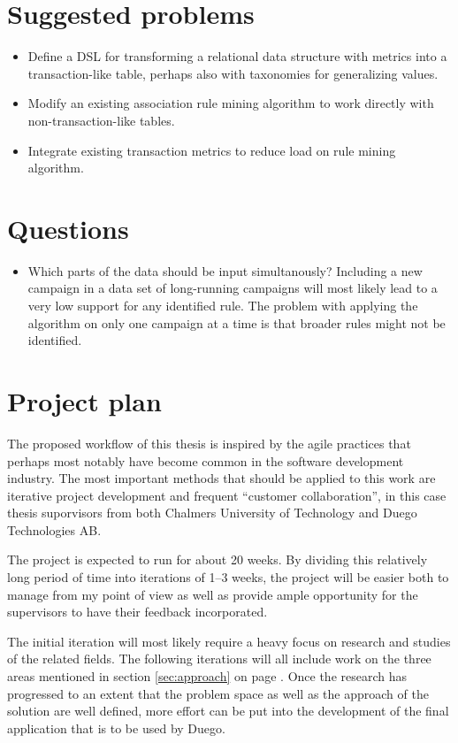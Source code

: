 \documentclass[a4paper]{article}
\begin{document}
\section{Suggested problems}
\begin{itemize}
	\item Define a DSL for transforming a relational data structure with metrics into a transaction-like table,
			perhaps also with taxonomies for generalizing values.
	\item Modify an existing association rule mining algorithm to work directly with non-transaction-like tables.
	\item Integrate existing transaction metrics to reduce load on rule mining algorithm.
\end{itemize}

\section{Questions}
\begin{itemize}
	\item Which parts of the data should be input simultanously? Including a new campaign in a data set of long-running
		campaigns will most likely lead to a very low support for any identified rule. The problem with applying the algorithm
		on only one campaign at a time is that broader rules might not be identified.
\end{itemize}

\section{Project plan}
The proposed workflow of this thesis is inspired by the agile practices that perhaps most notably have become
common in the software development industry. The most important methods that should be applied to this work are
iterative project development and frequent ``customer collaboration'', in this case thesis suporvisors from both
Chalmers University of Technology and Duego Technologies AB.

The project is expected to run for about 20 weeks. By dividing this relatively long period of time into iterations
of 1--3 weeks, the project will be easier both to manage from my point of view as well as provide ample opportunity
for the supervisors to have their feedback incorporated.

The initial iteration will most likely require a heavy focus on research and studies of the related fields. The following
iterations will all include work on the three areas mentioned in section \ref{sec:approach} on page \pageref{sec:approach}.
Once the research has progressed to an extent that the problem space as well as the approach of the solution are well defined,
more effort can be put into the development of the final application that is to be used by Duego.
\end{document}
